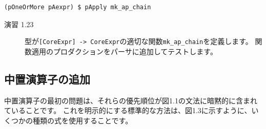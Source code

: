 \documentclass{jbook}
\begin{document}
\begin{verbatim}
(pOneOrMore pAexpr) $ pApply mk_ap_chain
\end{verbatim}

\begin{description}
	\item[演習 1.23] 型が\texttt{[CoreExpr] -> CoreExpr}の適切な関数\texttt{mk\_ap\_chain}を定義します。
		関数適用のプロダクションをパーサに追加してテストします。
\end{description}

\subsection{中置演算子の追加}

中置演算子の最初の問題は、それらの優先順位が図1.1の文法に暗黙的に含まれていることです。
これを明示的にする標準的な方法は、図1.3に示すように、いくつかの種類の式を使用することです。
\end{document}
